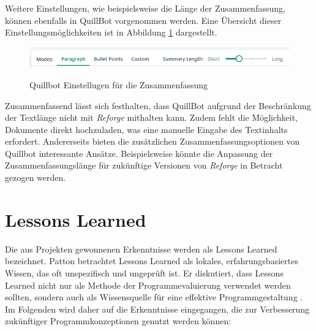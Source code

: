 Weitere Einstellungen, wie beispielsweise die Länge der Zusammenfassung, können ebenfalls in QuillBot vorgenommen werden. Eine Übersicht dieser Einstellungsmöglichkeiten ist in Abbildung \ref{fig:Quillbot_Modes} dargestellt.

\begin{figure}[H]
\centering
\includegraphics[width=0.8\linewidth]{Images/Quillbot_Modes.png}\\
\caption{Quillbot Einstellugen für die Zusammenfassung}
\label{fig:Quillbot_Modes}
\end{figure}

Zusammenfassend lässt sich festhalten, dass QuillBot aufgrund der Beschränkung der Textlänge nicht mit \textit{Reforge} mithalten kann. Zudem fehlt die Möglichkeit, Dokumente direkt hochzuladen, was eine manuelle Eingabe des Textinhalts erfordert. Andererseits bieten die zusätzlichen Zusammenfassungsoptionen von Quillbot interessante Ansätze. Beispielsweise könnte die Anpassung der Zusammenfassungslänge für zukünftige Versionen von \textit{Reforge} in Betracht gezogen werden.

\section{Lessons Learned}

Die aus Projekten gewonnenen Erkenntnisse werden als Lessons Learned bezeichnet. Patton betrachtet Lessons Learned als lokales, erfahrungsbasiertes Wissen, das oft unspezifisch und ungeprüft ist. Er diskutiert, dass Lessons Learned nicht nur als Methode der Programmevaluierung verwendet werden sollten, sondern auch als Wissensquelle für eine effektive Programmgestaltung \cite{patton2001evaluation}. Im Folgenden wird daher auf die Erkenntnisse eingegangen, die zur Verbesserung zukünftiger Programmkonzeptionen genutzt werden können:


